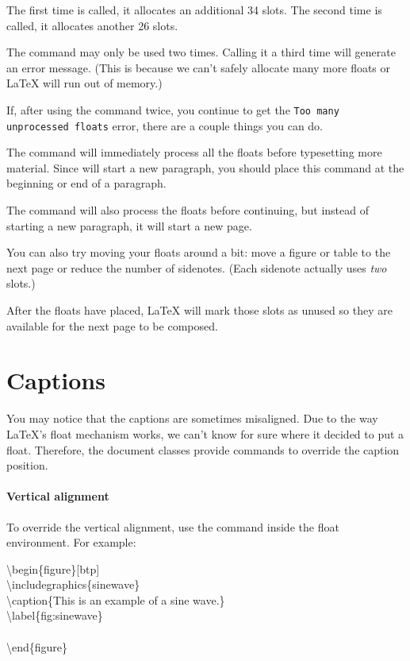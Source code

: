 The first time  is called, it allocates an additional 34
slots.  The second time  is called, it allocates another 26
slots.

The  command may only be used two times.  Calling it a
third time will generate an error message.  (This is because we can't safely
allocate many more floats or \LaTeX{} will run out of memory.)

If, after using the  command twice, you continue to get the
\texttt{Too many unprocessed floats} error, there are a couple things you can
do.

The  command will immediately process all the floats
before typesetting more material.  Since  will start a new
paragraph, you should place this command at the beginning or end of a
paragraph.

The  command will also process the floats before
continuing, but instead of starting a new paragraph, it will start a new page.

You can also try moving your floats around a bit: move a figure or table to the
next page or reduce the number of sidenotes.  (Each sidenote actually uses
\emph{two} slots.)

After the floats have placed, \LaTeX{} will mark those slots as unused so they
are available for the next page to be composed.

\section{Captions}
You may notice that the captions are sometimes misaligned.
Due to the way \LaTeX's float mechanism works, we can't know for sure where it
decided to put a float. Therefore, the \TL document classes provide commands to
override the caption position.

\paragraph{Vertical alignment} To override the vertical alignment, use the
 command inside the float environment.  For
example:

\begin{fullwidth}
\begin{docspec}
  \textbackslash begin\{figure\}[btp]\\
  \qquad \textbackslash includegraphics\{sinewave\}\\
  \qquad \textbackslash caption\{This is an example of a sine wave.\}\\
  \qquad \textbackslash label\{fig:sinewave\}\\
  \qquad {}\\
  \textbackslash end\{figure\}
\end{docspec}
\end{fullwidth}

